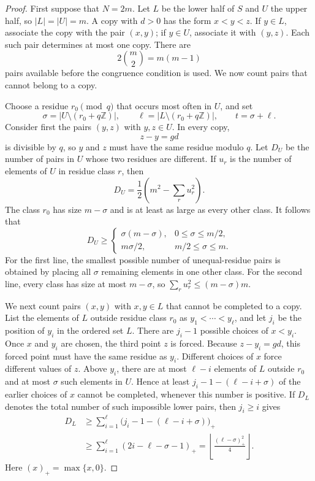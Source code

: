 \documentclass[11pt]{article}
\numberwithin{equation}{section}
\theoremstyle{remark}
\newcommand{\Z}{\mathbb Z}
\begin{document}
\begin{proof}
First suppose that $N=2m$.  Let $L$ be the lower half of $S$ and $U$ the
upper half, so $|L|=|U|=m$.  A copy with $d>0$ has the form $x<y<z$.
If $y\in L$, associate the copy with the pair $(x,y)$; if $y\in U$,
associate it with $(y,z)$.  Each such pair determines at most one copy.
There are
\[
 2\binom m2=m(m-1)
\]
pairs available before the congruence condition is used.  We now count
pairs that cannot belong to a copy.

Choose a residue $r_0\pmod q$ that occurs most often in $U$, and set
\[
 \sigma=|U\setminus(r_0+q\Z)|,
 \qquad
 \ell=|L\setminus(r_0+q\Z)|,
 \qquad
 t=\sigma+\ell.
\]
Consider first the pairs $(y,z)$ with $y,z\in U$.  In every copy,
\[
 z-y=gd
\]
is divisible by $q$, so $y$ and $z$ must have the same residue modulo $q$.
Let $D_U$ be the number of pairs in $U$ whose two residues are different.
If $u_r$ is the number of elements of $U$ in residue class $r$, then
\[
 D_U=\frac12\left(m^2-\sum_r u_r^2\right).
\]
The class $r_0$ has size $m-\sigma$ and is at least as large as every other
class.  It follows that
\begin{equation}\label{eq:DU-piecewise}
 D_U\ge
 \begin{cases}
 \sigma(m-\sigma),&0\le\sigma\le m/2,\\[1mm]
 m\sigma/2,&m/2\le\sigma\le m.
 \end{cases}
\end{equation}
For the first line, the smallest possible number of unequal-residue pairs is
obtained by placing all $\sigma$ remaining elements in one other class.  For
the second line, every class has size at most $m-\sigma$, so
$\sum_r u_r^2\le(m-\sigma)m$.

We next count pairs $(x,y)$ with $x,y\in L$ that cannot be completed to a
copy.  List the elements of $L$ outside residue class $r_0$ as
$y_1<\cdots<y_\ell$, and let $j_i$ be the position of $y_i$ in the ordered
set $L$.  There are $j_i-1$ possible choices of $x<y_i$.  Once $x$ and
$y_i$ are chosen, the third point $z$ is forced.  Because $z-y_i=gd$, this
forced point must have the same residue as $y_i$.  Different choices of $x$
force different values of $z$.
Above $y_i$, there are at most $\ell-i$ elements of $L$ outside $r_0$ and
at most $\sigma$ such elements in $U$.  Hence at least
$j_i-1-(\ell-i+\sigma)$ of the earlier choices of $x$ cannot be completed,
whenever this number is positive.  If $D_L$ denotes the total number of
such impossible lower pairs, then $j_i\ge i$ gives
\begin{equation}\label{eq:DL-rank}
 \begin{aligned}
 D_L
 &\ge\sum_{i=1}^{\ell}
       \bigl(j_i-1-(\ell-i+\sigma)\bigr)_+\\
 &\ge\sum_{i=1}^{\ell}(2i-\ell-\sigma-1)_+
  =\left\lfloor\frac{(\ell-\sigma)_+^2}{4}\right\rfloor.
 \end{aligned}
\end{equation}
Here $(x)_+=\max\{x,0\}$.


\end{proof}
\end{document}
